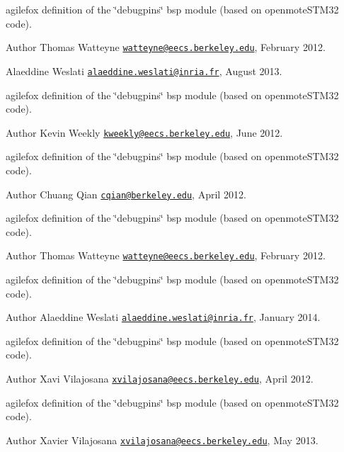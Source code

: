 agilefox definition of the \char`\"{}debugpins\char`\"{} bsp module (based on openmote\+S\+T\+M32 code). 

\begin{DoxyAuthor}{Author}
Thomas Watteyne \href{mailto:watteyne@eecs.berkeley.edu}{\tt watteyne@eecs.\+berkeley.\+edu}, February 2012. 

Alaeddine Weslati \href{mailto:alaeddine.weslati@inria.fr}{\tt alaeddine.\+weslati@inria.\+fr}, August 2013.
\end{DoxyAuthor}
agilefox definition of the \char`\"{}debugpins\char`\"{} bsp module (based on openmote\+S\+T\+M32 code).

\begin{DoxyAuthor}{Author}
Kevin Weekly \href{mailto:kweekly@eecs.berkeley.edu}{\tt kweekly@eecs.\+berkeley.\+edu}, June 2012.
\end{DoxyAuthor}
agilefox definition of the \char`\"{}debugpins\char`\"{} bsp module (based on openmote\+S\+T\+M32 code).

\begin{DoxyAuthor}{Author}
Chuang Qian \href{mailto:cqian@berkeley.edu}{\tt cqian@berkeley.\+edu}, April 2012.
\end{DoxyAuthor}
agilefox definition of the \char`\"{}debugpins\char`\"{} bsp module (based on openmote\+S\+T\+M32 code).

\begin{DoxyAuthor}{Author}
Thomas Watteyne \href{mailto:watteyne@eecs.berkeley.edu}{\tt watteyne@eecs.\+berkeley.\+edu}, February 2012.
\end{DoxyAuthor}
agilefox definition of the \char`\"{}debugpins\char`\"{} bsp module (based on openmote\+S\+T\+M32 code).

\begin{DoxyAuthor}{Author}
Alaeddine Weslati \href{mailto:alaeddine.weslati@inria.fr}{\tt alaeddine.\+weslati@inria.\+fr}, January 2014.
\end{DoxyAuthor}
agilefox definition of the \char`\"{}debugpins\char`\"{} bsp module (based on openmote\+S\+T\+M32 code).

\begin{DoxyAuthor}{Author}
Xavi Vilajosana \href{mailto:xvilajosana@eecs.berkeley.edu}{\tt xvilajosana@eecs.\+berkeley.\+edu}, April 2012.
\end{DoxyAuthor}
agilefox definition of the \char`\"{}debugpins\char`\"{} bsp module (based on openmote\+S\+T\+M32 code).

\begin{DoxyAuthor}{Author}
Xavier Vilajosana \href{mailto:xvilajosana@eecs.berkeley.edu}{\tt xvilajosana@eecs.\+berkeley.\+edu}, May 2013. 
\end{DoxyAuthor}


